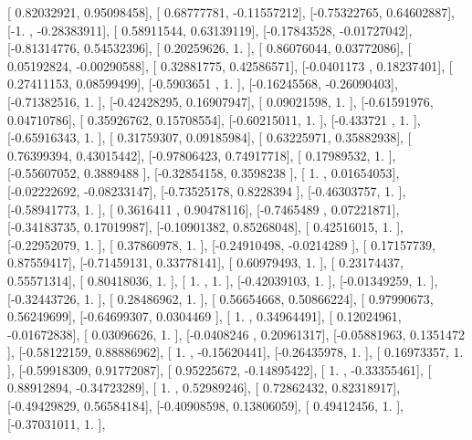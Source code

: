 \documentclass{article}
\begin{document}
       [ 0.82032921,  0.95098458],
       [ 0.68777781, -0.11557212],
       [-0.75322765,  0.64602887],
       [-1.        , -0.28383911],
       [ 0.58911544,  0.63139119],
       [-0.17843528, -0.01727042],
       [-0.81314776,  0.54532396],
       [ 0.20259626,  1.        ],
       [ 0.86076044,  0.03772086],
       [ 0.05192824, -0.00290588],
       [ 0.32881775,  0.42586571],
       [-0.0401173 ,  0.18237401],
       [ 0.27411153,  0.08599499],
       [-0.5903651 ,  1.        ],
       [-0.16245568, -0.26090403],
       [-0.71382516,  1.        ],
       [-0.42428295,  0.16907947],
       [ 0.09021598,  1.        ],
       [-0.61591976,  0.04710786],
       [ 0.35926762,  0.15708554],
       [-0.60215011,  1.        ],
       [-0.433721  ,  1.        ],
       [-0.65916343,  1.        ],
       [ 0.31759307,  0.09185984],
       [ 0.63225971,  0.35882938],
       [ 0.76399394,  0.43015442],
       [-0.97806423,  0.74917718],
       [ 0.17989532,  1.        ],
       [-0.55607052,  0.3889488 ],
       [-0.32854158,  0.3598238 ],
       [ 1.        ,  0.01654053],
       [-0.02222692, -0.08233147],
       [-0.73525178,  0.8228394 ],
       [-0.46303757,  1.        ],
       [-0.58941773,  1.        ],
       [ 0.3616411 ,  0.90478116],
       [-0.7465489 ,  0.07221871],
       [-0.34183735,  0.17019987],
       [-0.10901382,  0.85268048],
       [ 0.42516015,  1.        ],
       [-0.22952079,  1.        ],
       [ 0.37860978,  1.        ],
       [-0.24910498, -0.0214289 ],
       [ 0.17157739,  0.87559417],
       [-0.71459131,  0.33778141],
       [ 0.60979493,  1.        ],
       [ 0.23174437,  0.55571314],
       [ 0.80418036,  1.        ],
       [ 1.        ,  1.        ],
       [-0.42039103,  1.        ],
       [-0.01349259,  1.        ],
       [-0.32443726,  1.        ],
       [ 0.28486962,  1.        ],
       [ 0.56654668,  0.50866224],
       [ 0.97990673,  0.56249699],
       [-0.64699307,  0.0304469 ],
       [ 1.        ,  0.34964491],
       [ 0.12024961, -0.01672838],
       [ 0.03096626,  1.        ],
       [-0.0408246 ,  0.20961317],
       [-0.05881963,  0.1351472 ],
       [-0.58122159,  0.88886962],
       [ 1.        , -0.15620441],
       [-0.26435978,  1.        ],
       [ 0.16973357,  1.        ],
       [-0.59918309,  0.91772087],
       [ 0.95225672, -0.14895422],
       [ 1.        , -0.33355461],
       [ 0.88912894, -0.34723289],
       [ 1.        ,  0.52989246],
       [ 0.72862432,  0.82318917],
       [-0.49429829,  0.56584184],
       [-0.40908598,  0.13806059],
       [ 0.49412456,  1.        ],
       [-0.37031011,  1.        ],
\end{document}
